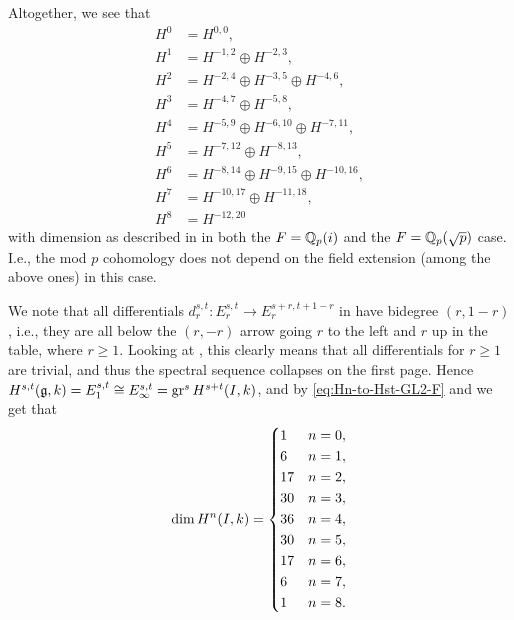 \clearpage
Altogether, we see that
\begin{equation}
  \label{eq:Hn-to-Hst-GL2-F}
  \begin{aligned}
    H^{0} &= H^{0,0}, \\
    H^{1} &= H^{-1,2} \oplus H^{-2,3}, \\
    H^{2} &= H^{-2,4} \oplus H^{-3,5} \oplus H^{-4,6}, \\
    H^{3} &= H^{-4,7} \oplus H^{-5,8}, \\
    H^{4} &= H^{-5,9} \oplus H^{-6,10} \oplus H^{-7,11}, \\
    H^{5} &= H^{-7,12} \oplus H^{-8,13}, \\
    H^{6} &= H^{-8,14} \oplus H^{-9,15} \oplus H^{-10,16}, \\
    H^{7} &= H^{-10,17} \oplus H^{-11,18}, \\
    H^{8} &= H^{-12,20}
  \end{aligned}
\end{equation}
with dimension as described in  in both the $F = \mathbb{Q}_{p}(i)$ and the $F = \mathbb{Q}_{p}(\sqrt{p})$ case. I.e., the mod $p$ cohomology does not depend on the field extension (among the above ones) in this case.

We note that all differentials $d_{r}^{s,t} \colon E_{r}^{s,t} \to E_{r}^{s+r,t+1-r}$ in  have bidegree $(r,1-r)$, i.e., they are all below the $(r,-r)$ arrow going $r$ to the left and $r$ up in the table, where $r \geq 1$. Looking at , this clearly means that all differentials for $r \geq 1$ are trivial, and thus the spectral sequence collapses on the first page. Hence $H^{s,t}(\mathfrak{g},k) = E_{1}^{s,t} \cong E_{\infty}^{s,t} = \operatorname{gr}^{s} H^{s+t}(I,k)$, and by \eqref{eq:Hn-to-Hst-GL2-F} and  we get that
\begin{equation}
  \label{eq:dim-HnI-GL2-F}
  \dim H^{n}(I,k) =
  \begin{dcases}
    1 & n=0, \\
    6 & n=1, \\
    17 & n=2, \\
    30 & n=3, \\
    36 & n=4, \\
    30 & n=5, \\
    17 & n=6, \\
    6 & n=7, \\
    1 & n=8.
  \end{dcases}
\end{equation}

